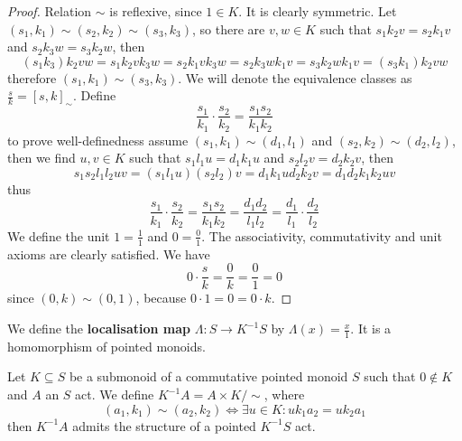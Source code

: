 \begin{proof}[Proof]
    Relation $\sim$ is reflexive, since $1\in K$. It is clearly symmetric. 
    Let $(s_1,k_1)\sim(s_2,k_2)\sim(s_3,k_3)$, so there are $v,w\in K$ such that 
    $s_1k_2v = s_2k_1v$ and $s_2k_3w = s_3k_2w$, then 
    \[
    (s_1k_3)k_2vw = s_1k_2vk_3w = s_2k_1vk_3w = s_2k_3wk_1v = s_3k_2wk_1v = (s_3k_1)k_2vw
    \]
    therefore $(s_1,k_1)\sim(s_3,k_3)$. We will denote the equivalence classes as
    $\frac{s}{k} = [s,k]_{\sim}$. Define 
    \[
        \frac{s_1}{k_1}\cdot\frac{s_2}{k_2} = \frac{s_1 s_2}{k_1 k_2}
    \]
    to prove well-definedness assume $(s_1,k_1)\sim(d_1,l_1)$ and $(s_2,k_2)\sim(d_2,l_2)$, then 
    we find $u,v\in K$ such that 
    $s_1l_1u=d_1k_1u$ and $s_2l_2v = d_2k_2v$, then 
    \[
    s_1s_2l_1l_2uv = (s_1l_1u)(s_2l_2)v = d_1k_1ud_2k_2v = d_1d_2k_1k_2uv 
    \]
    thus
    \[
        \frac{s_1}{k_1}\cdot\frac{s_2}{k_2} = \frac{s_1s_2}{k_1k_2} = \frac{d_1d_2}{l_1l_2} = \frac{d_1}{l_1}\cdot\frac{d_2}{l_2}
    \]
    We define the unit $1 = \frac{1}{1}$ and $0 = \frac{0}{1}$. The associativity, commutativity and unit axioms are clearly 
    satisfied. We have 
    \[
        0\cdot\frac{s}{k} = \frac{0}{k} = \frac{0}{1} = 0
    \]
    since $(0,k)\sim(0,1)$, because $0\cdot 1 = 0 = 0\cdot k$. 
\end{proof}
\begin{definition}
    We define the \textbf{localisation map} $\Lambda: S \to K^{-1}S$ by $\Lambda(x) = \frac{x}{1}$. It is a 
    homomorphism of pointed monoids.  
\end{definition}
\begin{proposition}
    Let $K\subseteq S$ be a submonoid of a commutative pointed monoid $S$ such that $0\not\in K$ and $A$ an $S$ act. We define 
    $K^{-1}A = A\times K/\sim$, where 
    \[
        (a_1,k_1)\sim(a_2,k_2) \iff \exists u\in K : uk_1 a_2 = uk_2 a_1
    \]
    then $K^{-1}A$ admits the structure of a pointed $K^{-1} S$ act.
\end{proposition}
